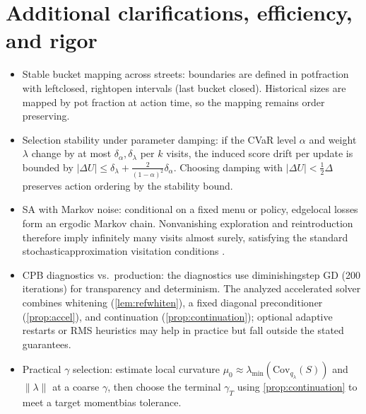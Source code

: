 \section{Additional clarifications, efficiency, and rigor}
\begin{itemize}
\item Stable bucket mapping across streets: boundaries are defined in pot\textendash fraction with left\textendash closed, right\textendash open intervals (last bucket closed). Historical sizes are mapped by pot fraction at action time, so the mapping remains order preserving.
\item Selection stability under parameter damping: if the CVaR level $\alpha$ and weight $\lambda$ change by at most $\delta_\alpha,\delta_\lambda$ per $k$ visits, the induced score drift per update is bounded by $|\Delta U|\le \delta_\lambda + \frac{2}{(1-\alpha)^2}\delta_\alpha$. Choosing damping with $|\Delta U|<\tfrac{1}{2}\Delta$ preserves action ordering by the stability bound.
\item SA with Markov noise: conditional on a fixed menu or policy, edge\textendash local losses form an ergodic Markov chain. Nonvanishing exploration and reintroduction therefore imply infinitely many visits almost surely, satisfying the standard stochastic\textendash approximation visitation conditions \cite{borkar2008sa,kushner2003sa}.
\item CPB diagnostics vs.\ production: the diagnostics use diminishing\textendash step GD (200 iterations) for transparency and determinism. The analyzed accelerated solver combines whitening (\cref{lem:refwhiten}), a fixed diagonal preconditioner (\cref{prop:accel}), and continuation (\cref{prop:continuation}); optional adaptive restarts or RMS heuristics may help in practice but fall outside the stated guarantees.
\item Practical $\gamma$ selection: estimate local curvature $\mu_0\approx \lambda_{\min}(\mathrm{Cov}_{q_{\lambda}}(S))$ and $\|\lambda\|$ at a coarse $\gamma$, then choose the terminal $\gamma_T$ using \cref{prop:continuation} to meet a target moment\textendash bias tolerance.
\end{itemize}


